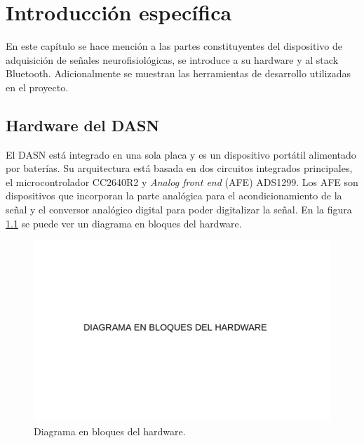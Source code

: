\chapter{Introducción específica} %

\label{Chapter2}

En este capítulo se hace mención a las partes constituyentes del dispositivo de adquisición de señales neurofisiológicas, se introduce a su hardware y al stack Bluetooth. Adicionalmente se muestran las herramientas de desarrollo utilizadas en el proyecto.

\section{Hardware del DASN}
\label{sec:Hard}
El DASN está integrado en una sola placa y es un dispositivo portátil alimentado por baterías. Su arquitectura está basada en dos circuitos integrados principales, el microcontrolador CC2640R2 y \textit{Analog front end} (AFE) ADS1299. Los AFE son dispositivos que incorporan la parte analógica para el acondicionamiento de la señal y el conversor analógico digital para poder digitalizar la señal. En la figura \ref{fig:diagBloquesHardware} se puede ver un diagrama en bloques del hardware.

\vspace{1cm}

\begin{figure}[htbp]
	\centering
	\includegraphics[width=1\textwidth]{./Figures/DiagramaEnBloquesHardware.png}
	\caption{Diagrama en bloques del hardware.}
	\label{fig:diagBloquesHardware}
\end{figure}

